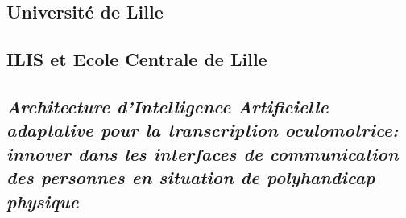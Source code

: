 \documentclass[
]{article}
\author{}
\date{}
\begin{document}
\hypertarget{universituxe9-de-lille}{%
\subsection{Université de Lille}\label{universituxe9-de-lille}}

\hypertarget{ilis-et-ecole-centrale-de-lille}{%
\subsection{\texorpdfstring{ILIS et Ecole Centrale de Lille{}}{ILIS et Ecole Centrale de Lille}}\label{ilis-et-ecole-centrale-de-lille}}

\hypertarget{section}{%
\subsection{}\label{section}}

\hypertarget{section-1}{%
\subsection{}\label{section-1}}

\hypertarget{architecture-dintelligence-artificielle-adaptative-pour-la-transcription-oculomotrice-innover-dans-les-interfaces-de-communication-des-personnes-en-situation-de-polyhandicap-physique}{%
\subsection{\texorpdfstring{\emph{Architecture d'Intelligence Artificielle adaptative pour la transcription oculomotrice: innover dans les interfaces de communication des personnes en situation de polyhandicap physique}}{Architecture d'Intelligence Artificielle adaptative pour la transcription oculomotrice: innover dans les interfaces de communication des personnes en situation de polyhandicap physique}}\label{architecture-dintelligence-artificielle-adaptative-pour-la-transcription-oculomotrice-innover-dans-les-interfaces-de-communication-des-personnes-en-situation-de-polyhandicap-physique}}

\hypertarget{section-2}{%
\subsection{}\label{section-2}}

\hypertarget{section-3}{%
\subsection{}\label{section-3}}
\end{document}
